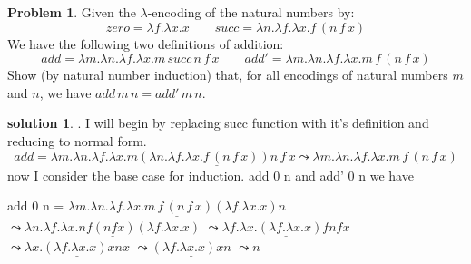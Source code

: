 \documentclass[10pt]{article}
\theoremstyle{definition}
\newtheorem{prob}{Problem}
\newtheorem{sol}{solution}
\begin{document}
\begin{prob}
  Given the $\lambda$-encoding of the natural numbers by:
  \[
    zero = \lambda f. \lambda x. x \qquad succ = \lambda n. \lambda f. \lambda x. f \, (n\,f\,x)
  \]
  We have the following two definitions of addition:
  \[
    add = \lambda m.\lambda n.\lambda f.\lambda x.m\,succ\,n\,f\,x \qquad add' = \lambda m.\lambda n.\lambda f.\lambda x. m\,f\,(n\,f\,x)
  \]
  Show (by natural number induction) that, for all encodings of natural numbers $m$ and $n$, we have $add\,m\,n = add'\,m\,n$.
\end{prob}

\begin{sol}. \newline
  I will begin by replacing succ function with it's definition and reducing to normal form. \newline
  \[
    add = \lambda m.\lambda n.\lambda f.\lambda x.m \underline{(\lambda n. \lambda f. \lambda x. f \, (n\,f\,x))n\,f\,x}
    \leadsto \lambda m.\lambda n.\lambda f.\lambda x. m\,f\,(n\,f\,x)
  \]
  now I consider the base case for induction.
  add 0 n and add' 0 n 
  we have
  
add 0 n = \newline
$ \underline{ \lambda m.\lambda n.\lambda f.\lambda x. m\,f\,(n\,f\,x) (\lambda f. \lambda x. x) n } $ \newline
$\leadsto \underline{ \lambda n. \lambda f. \lambda x. n f (nfx)(\lambda f. \lambda x.x)}$ \newline
$ \leadsto \underline{\lambda f. \lambda x. ( \lambda f . \lambda x.x) f n f x}$ \newline
$ \leadsto \underline{\lambda x. ( \lambda f. \lambda x.x) x n x} $  \newline
$ \leadsto \underline{(\lambda f. \lambda x. x) x n }$ \newline
$ \leadsto n$ \newline


\end{sol}
\end{document}
